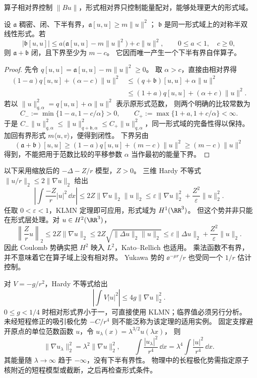 算子相对界控制 $\|Bu\|$，形式相对界只控制能量配对，能够处理更大的形式域。
\begin{theorem}
设 $\mathfrak a$ 稠密、闭、下半有界，$\mathfrak a[u,u]\ge m\|u\|^2$；
$\mathfrak b$ 是同一形式域上的对称半双线性形式。若
\begin{equation}\label{eq:math-sl-klmn-bound}
|\mathfrak b[u,u]|
\le a\bigl(\mathfrak a[u,u]-m\|u\|^2\bigr)+c\|u\|^2,
\qquad 0\le a<1,\quad c\ge0,
\end{equation}
则 $\mathfrak a+\mathfrak b$ 闭，且下界至少为 $m-c$。
它因而唯一产生一个下半有界自伴算子。
\end{theorem}
\begin{proof}
先令 $q[u,u]=\mathfrak a[u,u]-m\|u\|^2\ge0$。
取 $\alpha>c$，直接由相对界得
\[
\begin{aligned}
(1-a)q[u,u]+(\alpha-c)\|u\|^2
&\le(q+\mathfrak b)[u,u]+\alpha\|u\|^2\\
&\le(1+a)q[u,u]+(\alpha+c)\|u\|^2.
\end{aligned}
\]
若以 $\|u\|_{q,\alpha}^2=q[u,u]+\alpha\|u\|^2$ 表示原形式范数，
则两个明确的比较常数为
\[
C_-:=\min\{1-a,1-c/\alpha\}>0,\qquad
C_+:=\max\{1+a,1+c/\alpha\}<\infty.
\]
于是 $C_-\|u\|_{q,\alpha}^2\le\|u\|_{q+\mathfrak b,\alpha}^2
\le C_+\|u\|_{q,\alpha}^2$，同一形式域的完备性得以保持。
加回有界形式 $m\langle u,v\rangle$，便得到闭性。
下界另由
\[
(\mathfrak a+\mathfrak b)[u,u]
\ge(1-a)q[u,u]+(m-c)\|u\|^2
\ge(m-c)\|u\|^2
\]
得到，不能把用于范数比较的平移参数 $\alpha$ 当作最初的能量下界。
\end{proof}

\begin{example}
以下采用缩放后的 $-\Delta-Z/r$ 模型，$Z>0$。
三维 Hardy 不等式 $\|u/r\|_2\le2\|\nabla u\|_2$ 给出
\[
\left|\int\frac{-Z}{r}|u|^2\,\dd x\right|
\le2Z\|\nabla u\|_2\|u\|_2
\le\varepsilon\|\nabla u\|_2^2+\frac{Z^2}{\varepsilon}\|u\|_2^2.
\]
任取 $0<\varepsilon<1$，KLMN 定理即可应用，形式域为 $H^1(\RR^3)$。
但这个势并非只能在形式层处理。对 $u\in H^2(\RR^3)$，
\[
\left\|\frac Zr u\right\|_2
\le2Z\|\nabla u\|_2
\le2Z\sqrt{\|\Delta u\|_2\|u\|_2}
\le\varepsilon\|\Delta u\|_2+\frac{Z^2}{\varepsilon}\|u\|_2.
\]
因此 Coulomb 势确实把 $H^2$ 映入 $L^2$，Kato--Rellich 也适用。
乘法函数不有界，并不意味着它在算子域上没有相对界。
Yukawa 势的 $\ee^{-\mu r}/r$ 也受同一个 $1/r$ 估计控制。
\end{example}

\begin{example}
对 $V=-g/r^2$，Hardy 不等式给出
\[
\left|\int V|u|^2\right|\le4g\|\nabla u\|_2^2.
\]
$0\le g<1/4$ 时相对形式界小于一，可直接使用 KLMN；临界值必须另行分析。
未经短程修正的吸引极化势 $-C/r^4$ 则不能泛称为该定理的适用实例。
固定支撑避开原点的单位范数函数 $u$，令 $u_\lambda(x)=\lambda^{3/2}u(\lambda x)$，
则
\[
\|\nabla u_\lambda\|_2^2=\lambda^2\|\nabla u\|_2^2,\qquad
\int\frac{|u_\lambda|^2}{r^4}\,\dd x
=\lambda^4\int\frac{|u|^2}{r^4}\,\dd x.
\]
其能量随 $\lambda\to\infty$ 趋于 $-\infty$，没有下半有界性。
物理中的长程极化势需指定原子核附近的短程模型或截断，之后再检查形式条件。
\end{example}

